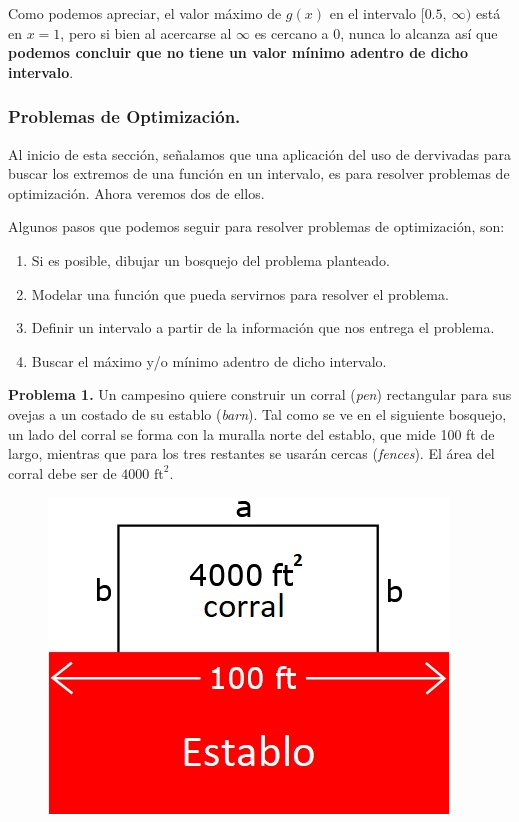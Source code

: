 \documentclass[12pt]{article}
\begin{document}
Como podemos apreciar, el valor máximo de $g(x)$ en el intervalo $[0.5, \ \infty)$ está en $x = 1$, pero si bien al acercarse al $\infty$ es cercano a $0$, nunca lo alcanza así que \textbf{podemos concluir que no tiene un valor mínimo adentro de dicho intervalo}.




\subsubsection{Problemas de Optimización.}

Al inicio de esta sección, señalamos que una aplicación del uso de dervivadas para buscar los extremos de una función en un intervalo, es para resolver problemas de optimización. Ahora veremos dos de ellos.

Algunos pasos que podemos seguir para resolver problemas de optimización, son:

\begin{enumerate}
\item Si es posible, dibujar un bosquejo del problema planteado.

\item Modelar una función que pueda servirnos para resolver el problema.

\item Definir un intervalo a partir de la información que nos entrega el problema.

\item Buscar el máximo y/o mínimo adentro de dicho intervalo.
\end{enumerate}

\textbf{Problema 1.} \quad Un campesino quiere construir un corral (\textit{pen}) rectangular para sus ovejas a un costado de su establo (\textit{barn}). Tal como se ve en el siguiente bosquejo, un lado del corral se forma con la muralla norte del establo, que mide 100 ft de largo, mientras que para los tres restantes se usarán cercas (\textit{fences}). El área del corral debe ser de $4000 \text{ ft}^{2}$.

\begin{figure}[hbt!]
\centering
\includegraphics[scale=0.5]{img/opt-prob-1.jpg}
\end{figure}
\end{document}

